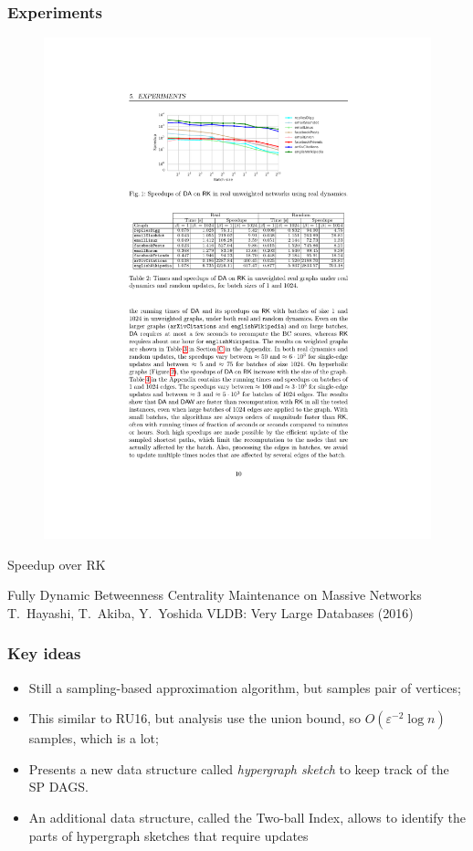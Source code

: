 \begin{frame}
  \frametitle{Experiments}
  \begin{figure}
    \includegraphics[width=\textwidth]{imgs/Bergamini-speedup.pdf}
  \end{figure}
  Speedup over RK
\end{frame}

\begin{frame}
  \centering
  \vfill
  {\huge Fully Dynamic Betweenness Centrality Maintenance on Massive
  Networks}
  \vfill
  {\Large T.~Hayashi, T.~Akiba, Y.~Yoshida}
  \vfill
  {\large VLDB: Very Large Databases (2016)}
  \vfill
\end{frame}

\begin{frame}
  \frametitle{Key ideas}
  \begin{itemize}
    \item Still a sampling-based approximation algorithm, but samples pair of
      vertices;
    \item This similar to RU16, but analysis use the union bound, so
      $O(\varepsilon^{-2}\log n)$ samples, which is a lot;
    \item Presents a new data structure called \emph{hypergraph sketch} to keep
      track of the SP DAGS.
      \pause
       \item An additional data structure, called the Two-ball Index, allows to
      identify the parts of hypergraph sketches that require updates
  \end{itemize}
\end{frame}

